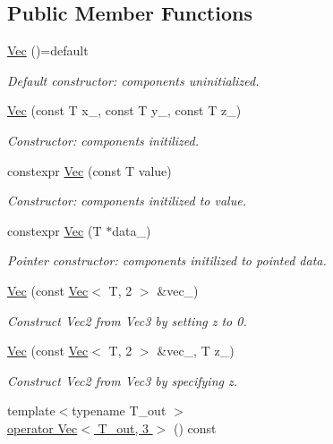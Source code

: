 \subsection*{Public Member Functions}
\begin{DoxyCompactItemize}
\item 
\hypertarget{structVec_3_01T_00_013_01_4_a0067c7aff3900cdb7180a2a43081cde9}{}\hyperlink{structVec_3_01T_00_013_01_4_a0067c7aff3900cdb7180a2a43081cde9}{Vec} ()=default\label{structVec_3_01T_00_013_01_4_a0067c7aff3900cdb7180a2a43081cde9}

\begin{DoxyCompactList}\small\item\em Default constructor\+: components uninitialized. \end{DoxyCompactList}\item 
\hyperlink{structVec_3_01T_00_013_01_4_a5b7405b3d5de4da6f3ae64a34ded20f2}{Vec} (const T x\+\_\+, const T y\+\_\+, const T z\+\_\+)
\begin{DoxyCompactList}\small\item\em Constructor\+: components initilized. \end{DoxyCompactList}\item 
constexpr \hyperlink{structVec_3_01T_00_013_01_4_ac72d7e468df1e33d4ab3fead9220b604}{Vec} (const T value)
\begin{DoxyCompactList}\small\item\em Constructor\+: components initilized to value. \end{DoxyCompactList}\item 
constexpr \hyperlink{structVec_3_01T_00_013_01_4_aca9ea0df8cd8e4301ae0fa7fd7d2f27e}{Vec} (T $\ast$data\+\_\+)
\begin{DoxyCompactList}\small\item\em Pointer constructor\+: components initilized to pointed data. \end{DoxyCompactList}\item 
\hyperlink{structVec_3_01T_00_013_01_4_a0c974365e952d0cd79979c9483ad2ae8}{Vec} (const \hyperlink{structVec}{Vec}$<$ T, 2 $>$ \&vec\+\_\+)
\begin{DoxyCompactList}\small\item\em Construct Vec2 from Vec3 by setting z to 0. \end{DoxyCompactList}\item 
\hyperlink{structVec_3_01T_00_013_01_4_a443a51b3428cb74e590654c4bd174a85}{Vec} (const \hyperlink{structVec}{Vec}$<$ T, 2 $>$ \&vec\+\_\+, T z\+\_\+)
\begin{DoxyCompactList}\small\item\em Construct Vec2 from Vec3 by specifying z. \end{DoxyCompactList}\item 
\hypertarget{structVec_3_01T_00_013_01_4_aec0f2f9c0ba16854de1fb1547530daa2}{}{\footnotesize template$<$typename T\+\_\+out $>$ }\\\hyperlink{structVec_3_01T_00_013_01_4_aec0f2f9c0ba16854de1fb1547530daa2}{operator Vec$<$ T\+\_\+out, 3 $>$} () const \label{structVec_3_01T_00_013_01_4_aec0f2f9c0ba16854de1fb1547530daa2}


\end{DoxyCompactItemize}
